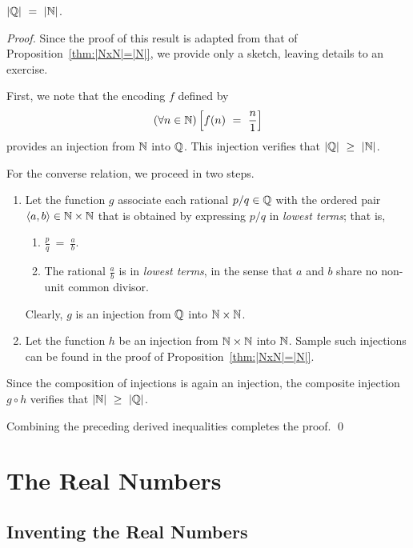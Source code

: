 \begin{prop}
\label{thm:|Q|=|N|}
$|\mathbb{Q}| \ = \ |\mathbb{N}|$.
\end{prop}

\begin{proof}
Since the proof of this result is adapted from that of
Proposition~\ref{thm:|NxN|=|N|}, we provide only a sketch, leaving
details to an exercise.

First, we note that the encoding $f$ defined by
\[ (\forall n \in \N) \left[ f(n) \ = \ \frac{n}{1} \right] \]
provides an injection from $\mathbb{N}$ into $\mathbb{Q}$.  This injection verifies
that $|\mathbb{Q}| \ \geq \ |\mathbb{N}|$.

For the converse relation, we proceed in two steps.
\begin{enumerate}
\item
Let the function $g$ associate each rational $p/q \in \mathbb{Q}$ with the
ordered pair $\langle a, b \rangle \in \mathbb{N} \times \mathbb{N}$ that is obtained
by expressing $p/q$ in {\em lowest terms}; that is,
  \begin{enumerate}
  \item
$\displaystyle \frac{p}{q} \ = \ \frac{a}{b}$.
  \item
The rational $\displaystyle \frac{a}{b}$ is in {\em lowest terms}, in
the sense that $a$ and $b$ share no non-unit common divisor.
  \end{enumerate}
Clearly, $g$ is an injection from $\mathbb{Q}$ into $\mathbb{N} \times \mathbb{N}$.

\item
Let the function $h$ be an injection from $\mathbb{N} \times \mathbb{N}$ into $\mathbb{N}$.
Sample such injections can be found in the proof of
Proposition~\ref{thm:|NxN|=|N|}.
\end{enumerate}
Since the composition of injections is again an injection, the
composite injection $g \circ h$ verifies
that $|\mathbb{N}| \ \geq \ |\mathbb{Q}|$.

Combining the preceding derived inequalities completes the proof.
\qed
\end{proof}


\section{The Real Numbers}
\label{sec:reals}

\subsection{Inventing the Real Numbers}
\label{sec:real-history}


